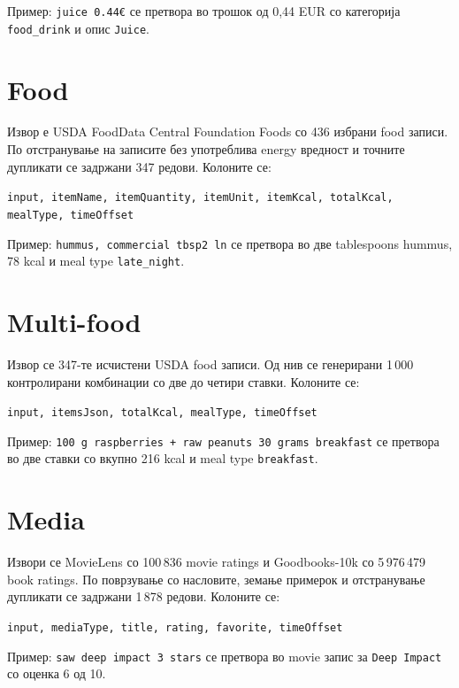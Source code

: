 Пример: \texttt{juice 0.44€} се претвора во трошок од 0,44 EUR со категорија \texttt{food\_drink} и опис \texttt{Juice}.

\section{Food}

Извор е USDA FoodData Central Foundation Foods со 436 избрани food записи.
По отстранување на записите без употреблива energy вредност и точните дупликати се задржани 347 редови.
Колоните се:

\begin{center}
  \texttt{input, itemName, itemQuantity, itemUnit, itemKcal, totalKcal, mealType, timeOffset}
\end{center}

Пример: \texttt{hummus, commercial tbsp2 ln} се претвора во две tablespoons hummus, 78 kcal и meal type \texttt{late\_night}.

\section{Multi-food}

Извор се 347-те исчистени USDA food записи.
Од нив се генерирани 1\,000 контролирани комбинации со две до четири ставки.
Колоните се:

\begin{center}
  \texttt{input, itemsJson, totalKcal, mealType, timeOffset}
\end{center}

Пример: \texttt{100 g raspberries + raw peanuts 30 grams breakfast} се претвора во две ставки со вкупно 216 kcal и meal type \texttt{breakfast}.

\section{Media}

Извори се MovieLens со 100\,836 movie ratings и Goodbooks-10k со 5\,976\,479 book ratings.
По поврзување со насловите, земање примерок и отстранување дупликати се задржани 1\,878 редови.
Колоните се:

\begin{center}
  \texttt{input, mediaType, title, rating, favorite, timeOffset}
\end{center}

Пример: \texttt{saw deep impact 3 stars} се претвора во movie запис за \texttt{Deep Impact} со оценка 6 од 10.
